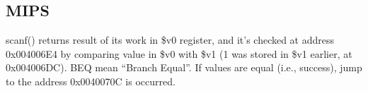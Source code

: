 ﻿\ifx\RUSSIAN\undefined

\subsection{MIPS}



scanf() returns result of its work in \$v0 register, and it's checked at address 0x004006E4
by comparing value in \$v0 with \$v1 (1 was stored in \$v1 earlier, at 0x004006DC).
BEQ mean ``Branch Equal''.
If values are equal (i.e., success), jump to the address 0x0040070C is occurred.

\fi
